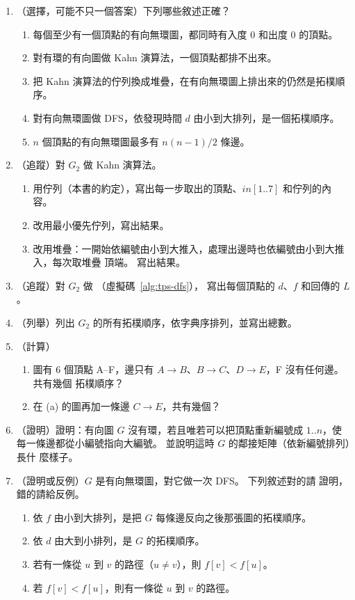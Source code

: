 \begin{enumerate}
\item \label{tps-q-tf}（選擇，可能不只一個答案）下列哪些敘述正確？
\begin{enumerate}
\item 每個至少有一個頂點的有向無環圖，都同時有入度 $0$ 和出度 $0$ 的頂點。
\item 對有環的有向圖做 Kahn 演算法，一個頂點都排不出來。
\item 把 Kahn 演算法的佇列換成堆疊，在有向無環圖上排出來的仍然是拓樸順序。
\item 對有向無環圖做 DFS，依發現時間 $d$ 由小到大排列，是一個拓樸順序。
\item $n$ 個頂點的有向無環圖最多有 $n(n-1)/2$ 條邊。
\end{enumerate}

\item \label{tps-q-kahn}（追蹤）對 $G_2$ 做 Kahn 演算法。
\begin{enumerate}
\item 用佇列（本書的約定），寫出每一步取出的頂點、$\mathit{in}[1..7]$ 和佇列的內容。
\item 改用最小優先佇列，寫出結果。
\item 改用堆疊：一開始依編號由小到大推入，處理出邊時也依編號由小到大推入，每次取堆疊
頂端。 寫出結果。
\end{enumerate}

\item \label{tps-q-dfs}（追蹤）對 $G_2$ 做 （虛擬碼~\ref{alg:tps-dfs}），
寫出每個頂點的 $d$、$f$ 和回傳的 $L$。

\item \label{tps-q-list}（列舉）列出 $G_2$ 的所有拓樸順序，依字典序排列，並寫出總數。

\item \label{tps-q-count}（計算）
\begin{enumerate}
\item 圖有 $6$ 個頂點 A--F，邊只有 $A \to B$、$B \to C$、$D \to E$，F 沒有任何邊。 共有幾個
拓樸順序？
\item 在 (a) 的圖再加一條邊 $C \to E$，共有幾個？
\end{enumerate}

\item \label{tps-q-upper}（證明）證明：有向圖 $G$ 沒有環，若且唯若可以把頂點重新編號成
$1..n$，使每一條邊都從小編號指向大編號。 並說明這時 $G$ 的鄰接矩陣（依新編號排列）長什
麼樣子。

\item \label{tps-q-dfs-tf}（證明或反例）$G$ 是有向無環圖，對它做一次 DFS。 下列敘述對的請
證明，錯的請給反例。
\begin{enumerate}
\item 依 $f$ 由小到大排列，是把 $G$ 每條邊反向之後那張圖的拓樸順序。
\item 依 $d$ 由大到小排列，是 $G$ 的拓樸順序。
\item 若有一條從 $u$ 到 $v$ 的路徑（$u \ne v$），則 $f[v] < f[u]$。
\item 若 $f[v] < f[u]$，則有一條從 $u$ 到 $v$ 的路徑。
\end{enumerate}


\end{enumerate}
